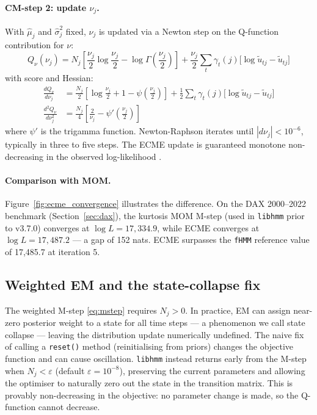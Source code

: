 \documentclass[11pt]{article}
\begin{document}
\paragraph{CM-step 2: update $\nu_j$.}
With $\hat{\mu}_j$ and $\hat{\sigma}_j^2$ fixed, $\nu_j$ is updated via a
Newton step on the Q-function contribution for $\nu$:
\begin{equation}
  Q_\nu(\nu_j) = N_j \!\left[\frac{\nu_j}{2}\log\frac{\nu_j}{2}
    - \log\Gamma\!\left(\frac{\nu_j}{2}\right)\right]
  + \frac{\nu_j}{2} \sum_t \gamma_t(j)\bigl[\log \tilde{u}_{tj} - \tilde{u}_{tj}\bigr]
\end{equation}
with score and Hessian:
\begin{align}
  \frac{dQ_\nu}{d\nu_j} &= \frac{N_j}{2}\!\left[\log\frac{\nu_j}{2} + 1
    - \psi\!\left(\frac{\nu_j}{2}\right)\right]
    + \frac{1}{2}\sum_t \gamma_t(j)\bigl[\log \tilde{u}_{tj} - \tilde{u}_{tj}\bigr] \\
  \frac{d^2 Q_\nu}{d\nu_j^2} &= \frac{N_j}{4}\!\left[\frac{2}{\nu_j}
    - \psi'\!\left(\frac{\nu_j}{2}\right)\right]
\end{align}
where $\psi'$ is the trigamma function.
Newton-Raphson iterates until $|d\nu_j| < 10^{-6}$, typically in three
to five steps.
The ECME update is guaranteed monotone non-decreasing in the observed
log-likelihood \citep{Liu1994}.

\paragraph{Comparison with MOM.}
Figure~\ref{fig:ecme_convergence} illustrates the difference.
On the DAX 2000--2022 benchmark (Section~\ref{sec:dax}),
the kurtosis MOM M-step (used in \texttt{libhmm} prior to v3.7.0)
converges at $\log L = 17{,}334.9$, while ECME converges at
$\log L = 17{,}487.2$ --- a gap of 152 nats.
ECME surpasses the \texttt{fHMM} reference value of 17{,}485.7
at iteration 5.

\subsection{Weighted EM and the state-collapse fix}
\label{sec:collapse}

The weighted M-step \eqref{eq:mstep} requires $N_j > 0$.
In practice, EM can assign near-zero posterior weight to a state for all
time steps --- a phenomenon we call state collapse --- leaving the
distribution update numerically undefined.
The naive fix of calling a \texttt{reset()} method (reinitialising from
priors) changes the objective function and can cause oscillation.
\texttt{libhmm} instead returns early from the M-step when
$N_j < \varepsilon$ (default $\varepsilon = 10^{-8}$), preserving the
current parameters and allowing the optimiser to naturally zero out the
state in the transition matrix.
This is provably non-decreasing in the objective: no parameter change
is made, so the Q-function cannot decrease.
\end{document}
